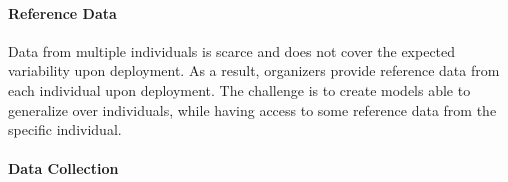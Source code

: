 \paragraph{Reference Data}
Data from multiple individuals is scarce and does not cover the expected variability upon deployment. 
As a result, organizers provide reference data from each individual upon deployment. %
The challenge is to create models able to generalize over individuals, while having access to some reference data from the specific individual. 


\paragraph{Data Collection}


